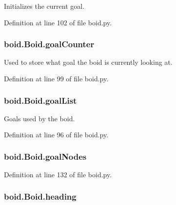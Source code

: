 Initializes the current goal. 



Definition at line 102 of file boid.\-py.

\hypertarget{classboid_1_1Boid_a8a871af6fc4d19477ce4881eb9ddc629}{
\subsubsection[{goal\-Counter}]{\setlength{\rightskip}{0pt plus 5cm}boid.\-Boid.\-goal\-Counter}}\label{classboid_1_1Boid_a8a871af6fc4d19477ce4881eb9ddc629}


Used to store what goal the boid is currently looking at. 



Definition at line 99 of file boid.\-py.

\hypertarget{classboid_1_1Boid_a7a3492977220ee1f7623aa9643a2fea4}{
\subsubsection[{goal\-List}]{\setlength{\rightskip}{0pt plus 5cm}boid.\-Boid.\-goal\-List}}\label{classboid_1_1Boid_a7a3492977220ee1f7623aa9643a2fea4}


Goals used by the boid. 



Definition at line 96 of file boid.\-py.

\hypertarget{classboid_1_1Boid_a8d7aa6d57eb3589a0770af8fcbf1aa0b}{
\subsubsection[{goal\-Nodes}]{\setlength{\rightskip}{0pt plus 5cm}boid.\-Boid.\-goal\-Nodes}}\label{classboid_1_1Boid_a8d7aa6d57eb3589a0770af8fcbf1aa0b}


Definition at line 132 of file boid.\-py.

\hypertarget{classboid_1_1Boid_afc4b725b80313dc3604ac36015f84156}{
\subsubsection[{heading}]{\setlength{\rightskip}{0pt plus 5cm}boid.\-Boid.\-heading}}\label{classboid_1_1Boid_afc4b725b80313dc3604ac36015f84156}


